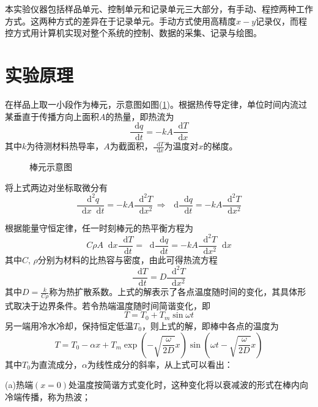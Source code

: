 \documentclass[UTF-8,twoside,cs4size]{ctexart}
\newcommand*{\dif}{\mathop{}\!\mathrm{d}}
\begin{document}
	本实验仪器包括样品单元、控制单元和记录单元三大部分，有手动、程控两种工作方式。这两种方式的差异在于记录单元。手动方式使用高精度$ x-y $记录仪，而程控方式用计算机实现对整个系统的控制、数据的采集、记录与绘图。
	
	\section{实验原理}
	在样品上取一小段作为棒元，示意图如图(\ref{difx})。根据热传导定律，单位时间内流过某垂直于传播方向上面积$ A $的热量，即热流为
	\[\frac{\dif q}{\dif t}=-kA\frac{\dif T}{\dif x}\]
	其中$ k $为待测材料热导率，$ A $为截面积，$ \frac{\dif T}{\dif x} $为温度对$ x $的梯度。
	
	\begin{figure}[!h]
		\centering
		\caption{棒元示意图}
		\label{difx}
	\end{figure}

	将上式两边对坐标取微分有
	\[\frac{\dif^2 q}{\dif x\dif t}=-kA\frac{\dif^2 T}{\dif x^2}\,\Longrightarrow\,\dif\frac{\dif q}{\dif t}=-kA\frac{\dif^2 T}{\dif x^2}\]
	
	根据能量守恒定律，任一时刻棒元的热平衡方程为
	\[C\rho A\dif x\frac{\dif T}{\dif t}=\dif\frac{\dif q}{\dif t}=-kA\frac{\dif^2 T}{\dif x^2}\dif x\]
	其中$ C,\,\rho $分别为材料的比热容与密度，由此可得热流方程
	\[\frac{\dif T}{\dif t}=D\frac{\dif^2 T}{\dif x^2}\]
	其中$ D=\frac{k}{C\rho} $称为热扩散系数。上式的解表示了各点温度随时间的变化，其具体形式取决于边界条件。若令热端温度随时间简谐变化，即
	\[T=T_0+T_m\sin\omega t\]
	另一端用冷水冷却，保持恒定低温$ T_0 $，则上式的解，即棒中各点的温度为
	\[T=T_0-\alpha x+T_m\exp\left(-\sqrt{\frac{\omega}{2D}}x\right)\sin\left(\omega t-\sqrt{\frac{\omega}{2D}}x\right)\]
	其中$ T_0 $为直流成分，$ \alpha $为线性成分的斜率，从上式可以看出：
	
	{\kaishu (a)热端$ (x=0) $处温度按简谐方式变化时，这种变化将以衰减波的形式在棒内向冷端传播，称为热波；}
	
\end{document}
